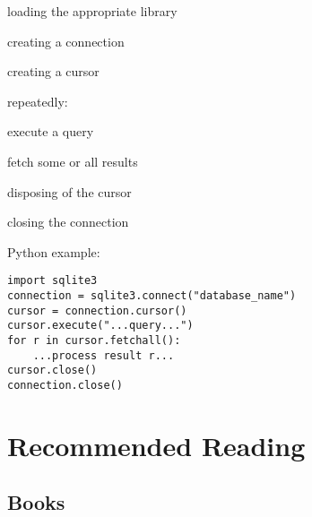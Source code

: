 \documentclass{book}
\begin{document}
\begin{swcitemize}
\item
  loading the appropriate library
\item
  creating a connection
\item
  creating a cursor
\item
  repeatedly:

  \begin{swcitemize2}
  \item
    execute a query
  \item
    fetch some or all results
   \end{swcitemize2}
\item
  disposing of the cursor
\item
  closing the connection
\end{swcitemize}

Python example:

\begin{Verbatim}
import sqlite3
connection = sqlite3.connect("database_name")
cursor = connection.cursor()
cursor.execute("...query...")
for r in cursor.fetchall():
    ...process result r...
cursor.close()
connection.close()
\end{Verbatim}

\chapter{Recommended Reading}\label{s:bib}

\section{Books}
\end{document}
